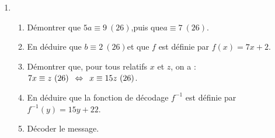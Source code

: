 \begin{activite}
\begin{enumerate}
\item \begin{enumerate}
\item Démontrer que \enskip $5a\equiv 9~(26)$,\enskip puis que\enskip $a\equiv7~(26)$.
\item En déduire que \enskip $b\equiv2~(26)$\enskip et que $f$ est
  définie par $f(x)=7x+2$.
\item Démontrer que, pour tous relatifs $x$ et $z$, on a :\enskip
$7x\equiv z~(26)\enskip \Leftrightarrow\enskip x\equiv15z~(26)$.

\item En déduire que la fonction de décodage $f^{-1}$ est définie par \enskip $f^{-1}(y)=15y+22$.
\item Décoder le message.
\end{enumerate}
\end{enumerate}

\vspace{-1cm}
\end{activite}
